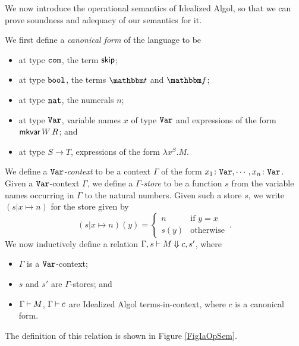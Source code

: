 \documentclass[11pt]{report}
\begin{document}
We now introduce the operational semantics of Idealized Algol, so that we can prove soundness and adequacy of our semantics for it.

We first define a \emph{canonical form} of the language to be
\begin{itemize}
  \item at type ${\mathtt{com}}$, the term ${\mathsf{skip}}$;
  \item at type ${\mathtt{bool}}$, the terms $\true$ and $\false$;
  \item at type ${\mathtt{nat}}$, the numerals $n$; 
  \item at type ${\mathtt{Var}}$, variable names $x$ of type ${\mathtt{Var}}$ and expressions of the form $\operatorname{{\mathsf{mkvar}}} W\,R$; and
  \item at type $S\to T$, expressions of the form $\lambda x^S.M$.
\end{itemize}

We define a \emph{${\mathtt{Var}}$-context} to be a context $\Gamma$ of the form $x_1\colon {\mathtt{Var}},\cdots,x_n\colon {\mathtt{Var}}$.
Given a ${\mathtt{Var}}$-context $\Gamma$, we define a \emph{$\Gamma$-store} to be a function $s$ from the variable names occurring in $\Gamma$ to the natural numbers.  
Given such a store $s$, we write $(s\vert x \mapsto n)$ for the store given by
\[
  (s\vert x\mapsto n)(y) = \begin{cases}
    n & \text{if $y = x$} \\
    s(y) & \text{otherwise}
  \end{cases}\,.
  \]
We now inductively define a relation $\Gamma,s\mathbin{\vdash} M\Downarrow c,s'$, where
\begin{itemize}
  \item $\Gamma$ is a ${\mathtt{Var}}$-context; 
  \item $s$ and $s'$ are $\Gamma$-stores;  and
  \item $\Gamma\mathbin{\vdash} M$, $\Gamma\mathbin{\vdash} c$ are Idealized Algol terms-in-context, where $c$ is a canonical form.
\end{itemize}
The definition of this relation is shown in Figure \ref{FigIaOpSem}.
\end{document}
